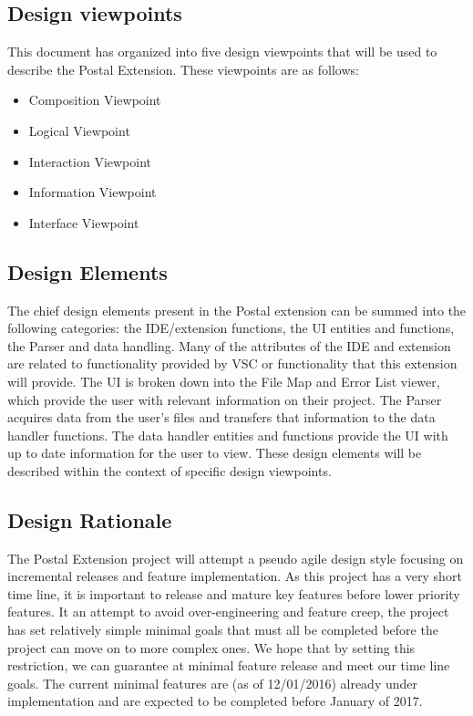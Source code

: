 \documentclass[letterpaper,10pt,titlepage,draftclsnofoot,onecolumn,onesided] {IEEEtran}
\begin{document}
\subsection{Design viewpoints}
This document has organized into five design viewpoints that will be used to describe the Postal Extension.
These viewpoints are as follows:
\begin {itemize}
\item Composition Viewpoint
\item Logical Viewpoint
\item Interaction Viewpoint
\item Information Viewpoint
\item Interface Viewpoint
\end {itemize}

\subsection{Design Elements}
The chief design elements present in the Postal extension can be summed into the following categories: the IDE/extension functions, the UI entities and functions, the Parser and data handling.
Many of the attributes of the IDE and extension are related to functionality provided by VSC or functionality that this extension will provide. 
The UI is broken down into the File Map and Error List viewer, which provide the user with relevant information on their project.
The Parser acquires data from the user's files and transfers that information to the data handler functions.
The data handler entities and functions provide the UI with up to date information for the user to view.
These design elements will be described within the context of specific design viewpoints.

\subsection{Design Rationale}
The Postal Extension project will attempt a pseudo agile design style focusing on incremental releases and feature implementation.
As this project has a very short time line, it is important to release and mature key features before lower priority features. 
It an attempt to avoid over-engineering and feature creep, the project has set relatively simple minimal goals that must all be completed before the project can move on to more complex ones.
We hope that by setting this restriction, we can guarantee at minimal feature release and meet our time line goals.
The current minimal features are (as of 12/01/2016) already under implementation and are expected to be completed before January of 2017.
\end{document}
